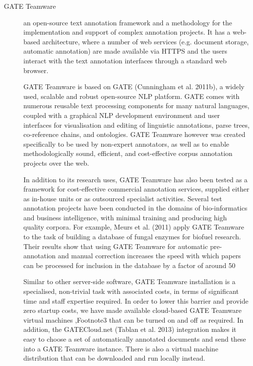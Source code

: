   \begin{description}
    \item[GATE Teamware]
    an open-source text annotation framework and a methodology for the implementation and support of complex annotation projects. It has a web-based architecture, where a number of web services (e.g. document storage, automatic annotation) are made available via HTTPS and the users interact with the text annotation interfaces through a standard web browser.

    GATE Teamware is based on GATE (Cunningham et al. 2011b), a widely used, scalable and robust open-source NLP platform. GATE comes with numerous reusable text processing components for many natural languages, coupled with a graphical NLP development environment and user interfaces for visualisation and editing of linguistic annotations, parse trees, co-reference chains, and ontologies. GATE Teamware however was created specifically to be used by non-expert annotators, as well as to enable methodologically sound, efficient, and cost-effective corpus annotation projects over the web.

    In addition to its research uses, GATE Teamware has also been tested as a framework for cost-effective commercial annotation services, supplied either as in-house units or as outsourced specialist activities. Several test annotation projects have been conducted in the domains of bio-informatics and business intelligence, with minimal training and producing high quality corpora. For example, Meurs et al. (2011) apply GATE Teamware to the task of building a database of fungal enzymes for biofuel research. Their results show that using GATE Teamware for automatic pre-annotation and manual correction increases the speed with which papers can be processed for inclusion in the database by a factor of around 50 %

    Similar to other server-side software, GATE Teamware installation is a specialised, non-trivial task with associated costs, in terms of significant time and staff expertise required. In order to lower this barrier and provide zero startup costs, we have made available cloud-based GATE Teamware virtual machines ,Footnote3 that can be turned on and off as required. In addition, the GATECloud.net (Tablan et al. 2013) integration makes it easy to choose a set of automatically annotated documents and send these into a GATE Teamware instance. There is also a virtual machine distribution that can be downloaded and run locally instead.


\end{description}
